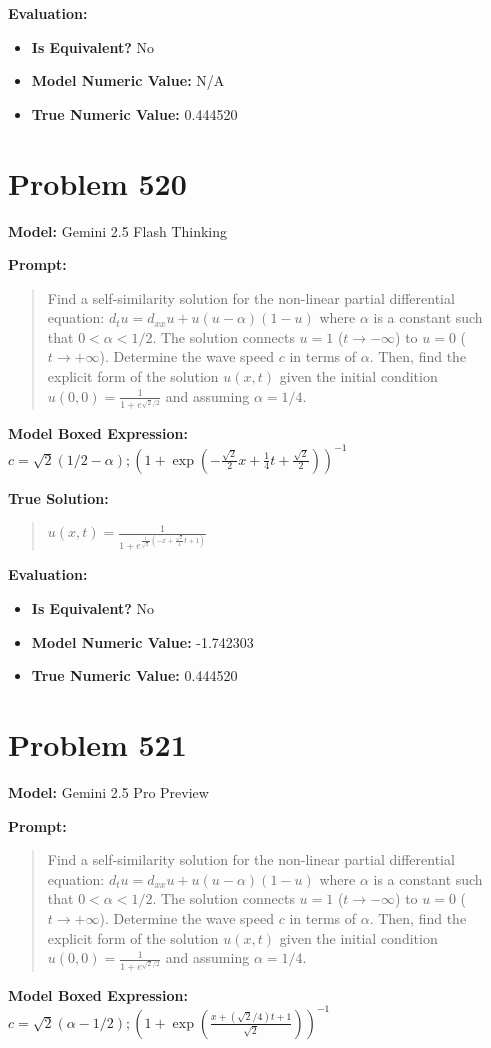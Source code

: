 \documentclass{article}
\begin{document}
\textbf{Evaluation:}
\begin{itemize}
\item \textbf{Is Equivalent?} No
\item \textbf{Model Numeric Value:} N/A
\item \textbf{True Numeric Value:} 0.444520
\end{itemize}
\vspace{1cm}
\section*{Problem 520}
\textbf{Model:} Gemini 2.5 Flash Thinking

\textbf{Prompt:}
\begin{quote}
Find a self-similarity solution for the non-linear partial differential equation: $d_t u = d_{xx}u + u(u - \alpha)(1 - u)$ where $\alpha$ is a constant such that $0 < \alpha < 1/2$. The solution connects $u=1$ ($t \rightarrow -\infty$) to $u=0$ ($t \rightarrow +\infty$). Determine the wave speed $c$ in terms of $\alpha$. Then, find the explicit form of the solution $u(x,t)$ given the initial condition $u(0,0) = \frac{1}{1+e^{\sqrt{2}/2}}$ and assuming $\alpha = 1/4$.
\end{quote}
\textbf{Model Boxed Expression:} $c=\sqrt{2}(1/2-\alpha); \left(1+\exp\left(-\frac{\sqrt{2}}{2}x+\frac{1}{4}t+\frac{\sqrt{2}}{2}\right)\right)^{-1}$

\textbf{True Solution:}
\begin{quote}
$u(x,t) = \frac{1}{1+e^{\frac{1}{\sqrt{2}}(-x + \frac{\sqrt{2}}{4}t + 1)}}$
\end{quote}

\textbf{Evaluation:}
\begin{itemize}
\item \textbf{Is Equivalent?} No
\item \textbf{Model Numeric Value:} -1.742303
\item \textbf{True Numeric Value:} 0.444520
\end{itemize}
\vspace{1cm}
\section*{Problem 521}
\textbf{Model:} Gemini 2.5 Pro Preview

\textbf{Prompt:}
\begin{quote}
Find a self-similarity solution for the non-linear partial differential equation: $d_t u = d_{xx}u + u(u - \alpha)(1 - u)$ where $\alpha$ is a constant such that $0 < \alpha < 1/2$. The solution connects $u=1$ ($t \rightarrow -\infty$) to $u=0$ ($t \rightarrow +\infty$). Determine the wave speed $c$ in terms of $\alpha$. Then, find the explicit form of the solution $u(x,t)$ given the initial condition $u(0,0) = \frac{1}{1+e^{\sqrt{2}/2}}$ and assuming $\alpha = 1/4$.
\end{quote}
\textbf{Model Boxed Expression:} $c=\sqrt{2}(\alpha-1/2) ; \left(1+\exp\left(\frac{x+(\sqrt{2}/4)t+1}{\sqrt{2}}\right)\right)^{-1}$
\end{document}
